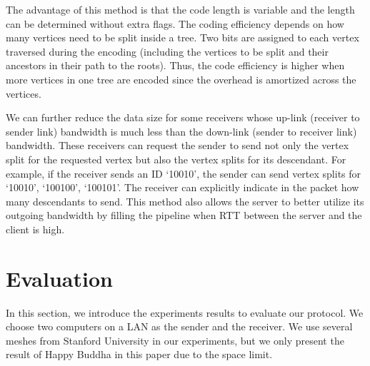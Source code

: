     The advantage of this method is that the code length is variable and the 
    length can be determined without extra flags. The coding efficiency depends
    on how many vertices need to be split inside a tree. Two bits
    are assigned to each vertex traversed during the encoding
    (including the vertices to be split and their ancestors in their path
    to the roots). Thus, the code efficiency is higher when more vertices in one tree
    are encoded since the overhead is amortized across the vertices. 

    We can further reduce the data size for some receivers whose up-link (receiver to
    sender link) bandwidth is much less than the down-link (sender to receiver link) 
    bandwidth. These receivers can request the sender to send not only the vertex split
    for the requested vertex but also the vertex splits for its descendant.
    For example, if the receiver sends an ID 
    `10010', the sender can send vertex splits for `10010', `100100', `100101'.
    The receiver can explicitly indicate in the packet how many descendants to send. This method 
	also allows the server to better utilize its outgoing bandwidth by filling the pipeline when RTT between the server and the client is high.

\section{Evaluation}
In this section, we introduce the experiments results to evaluate our protocol.
We choose two computers on a LAN as the sender and the receiver. 
We use several meshes from Stanford University in our experiments, but we only
present the result of Happy Buddha in this paper due to the space limit.
\label{s:dstream:evaluation}
